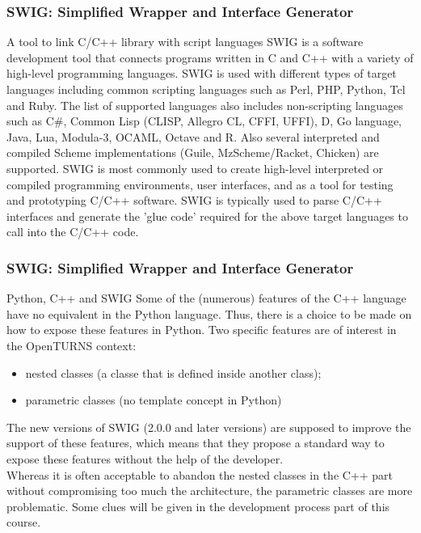 \documentclass[8pt]{beamer}
\begin{document}
\begin{frame}
  \frametitle{SWIG: Simplified Wrapper and Interface Generator}
  \begin{block}{A tool to link C/C++ library with script languages}
    SWIG is a software development tool that connects programs written in C and C++ with a variety of high-level programming languages. SWIG is used with different types of target languages including common scripting languages such as Perl, PHP, Python, Tcl and Ruby. The list of supported languages also includes non-scripting languages such as C\#, Common Lisp (CLISP, Allegro CL, CFFI, UFFI), D, Go language, Java, Lua, Modula-3, OCAML, Octave and R. Also several interpreted and compiled Scheme implementations (Guile, MzScheme/Racket, Chicken) are supported. SWIG is most commonly used to create high-level interpreted or compiled programming environments, user interfaces, and as a tool for testing and prototyping C/C++ software. SWIG is typically used to parse C/C++ interfaces and generate the 'glue code' required for the above target languages to call into the C/C++ code.
  \end{block}
\end{frame}
\begin{frame}
  \frametitle{SWIG: Simplified Wrapper and Interface Generator}
  \begin{block}{Python, C++ and SWIG}
    Some of the (numerous) features of the C++ language have no equivalent in the Python language. Thus, there is a choice to be made on how to expose these features in Python. Two specific features are of interest in the OpenTURNS context:
    \begin{itemize}
    \item nested classes (a classe that is defined inside another class);
    \item parametric classes (no template concept in Python)
    \end{itemize}
    The new versions of SWIG (2.0.0 and later versions) are supposed to improve the support of these features, which means that they propose a standard way to expose these features without the help of the developer.\\
    Whereas it is often acceptable to abandon the nested classes in the C++ part without compromising too much the architecture, the parametric classes are more problematic. Some clues will be given in the development process part of this course.
  \end{block}
\end{frame}
\end{document}
